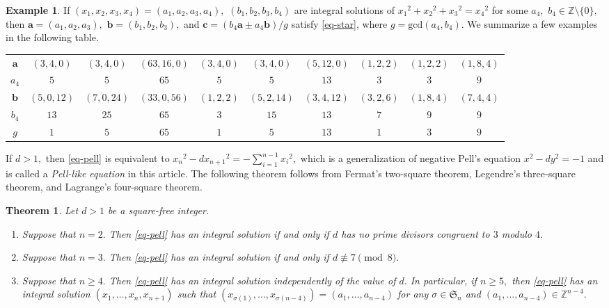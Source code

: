 \documentclass{article}
\theoremstyle{definition}
\newtheorem{eg}{Example}
\theoremstyle{plain}
\newtheorem{thm}{Theorem}
\begin{document}
\begin{eg}
If $(x_1,x_2,x_3,x_4) = (a_1,a_2,a_3,a_4),$ $(b_1,b_2,b_3,b_4)$ are integral solutions of $x_1{}^2+x_2{}^2+x_3{}^2 = x_4{}^2$ for some $a_4,$ $b_4 \in \mathbb Z\setminus\{ 0\},$ then $\bm{a} = (a_1,a_2,a_3),$ $\bm{b} = (b_1,b_2,b_3),$ and $\bm{c} = (b_4\bm{a}\pm a_4\bm{b})/g$ satisfy \eqref{eq-star}, where $g = \mathrm{gcd}(a_4,b_4).$
We summarize a few examples in the following table. 
\begin{center}\begin{tabular}{|c||c|c|c|c|c|c|c|c|c|} \hline 
$\bm{a}$ & $(3,4,0)$ & $(3,4,0)$ & $(63,16,0)$ & $(3,4,0)$ & $(3,4,0)$ & $(5,12,0)$ & $(1,2,2)$ & $(1,2,2)$ & $(1,8,4)$ \\ 
$a_4$ & $5$ & $5$ & $65$ & $5$ & $5$ & $13$ & $3$ & $3$ & $9$ \\ 
$\bm{b}$ & $(5,0,12)$ & $(7,0,24)$ & $(33,0,56)$ & $(1,2,2)$ & $(5,2,14)$ & $(3,4,12)$ & $(3,2,6)$ & $(1,8,4)$ & $(7,4,4)$ \\ 
$b_4$ & $13$ & $25$ & $65$ & $3$ & $15$ & $13$ & $7$ & $9$ & $9$ \\ 
$g$ & $1$ & $5$ & $65$ & $1$ & $5$ & $13$ & $1$ & $3$ & $9$ \\ \hline 
\end{tabular}\end{center}
\end{eg}
If $d > 1,$ then \eqref{eq-pell} is equivalent to $x_n{}^2-dx_{n+1}{}^2 = -\sum_{i = 1}^{n-1}x_i{}^2,$ which is a generalization of negative Pell's equation $x^2-dy^2 = -1$ and is called a {\it Pell-like equation} in this article. 
The following theorem follows from Fermat's two-square theorem, Legendre's three-square theorem, and Lagrange's four-square theorem. 
\begin{thm}\label{thm-ex-pell}
Let $d > 1$ be a square-free integer.
\begin{enumerate}
\item[{\rm (1)}]
Suppose that $n = 2.$ 
Then \eqref{eq-pell} has an integral solution if and only if $d$ has no prime divisors congruent to $3$ modulo $4.$
\item[{\rm (2)}]
Suppose that $n = 3.$ 
Then \eqref{eq-pell} has an integral solution if and only if $d \not\equiv 7 \pmod 8.$
\item[{\rm (3)}]
Suppose that $n \geq 4.$ 
Then \eqref{eq-pell} has an integral solution independently of the value of $d.$ 
In particular, if $n \geq 5,$ then \eqref{eq-pell} has an integral solution $(x_1,\dots,x_n,x_{n+1})$ such that $(x_{\sigma (1)},\dots,x_{\sigma (n-4)}) = (a_1,\dots,a_{n-4})$ for any $\sigma \in \mathfrak S_n$ and $(a_1,\dots,a_{n-4}) \in \mathbb Z^{n-4}.$
\end{enumerate}
\end{thm}
\end{document}
